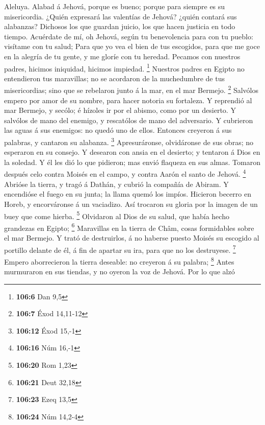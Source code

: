  Aleluya. Alabad á Jehová, porque es bueno; porque para
siempre es su misericordia.  ¿Quién expresará las valentías
de Jehová? ¿quién contará sus alabanzas?  Dichosos los que
guardan juicio, los que hacen justicia en todo tiempo. 
Acuérdate de mí, oh Jehová, según tu benevolencia para con tu pueblo:
visítame con tu salud;  Para que yo vea el bien de tus
escogidos, para que me goce en la alegría de tu gente, y me gloríe con
tu heredad.  Pecamos con nuestros padres, hicimos iniquidad,
hicimos impiedad. \footnote{\textbf{106:6} Dan 9,5} 
Nuestros padres en Egipto no entendieron tus maravillas; no se acordaron
de la muchedumbre de tus misericordias; sino que se rebelaron junto á la
mar, en el mar Bermejo. \footnote{\textbf{106:7} Éxod 14,11-12}
 Salvólos empero por amor de su nombre, para hacer notoria
su fortaleza.  Y reprendió al mar Bermejo, y secólo; é
hízoles ir por el abismo, como por un desierto.  Y salvólos
de mano del enemigo, y rescatólos de mano del adversario. 
Y cubrieron las aguas á sus enemigos: no quedó uno de ellos.
 Entonces creyeron á sus palabras, y cantaron su alabanza.
\footnote{\textbf{106:12} Éxod 15,-1}  Apresuráronse,
olvidáronse de sus obras; no esperaron en su consejo.  Y
desearon con ansia en el desierto; y tentaron á Dios en la soledad.
 Y él les dió lo que pidieron; mas envió flaqueza en sus
almas.  Tomaron después celo contra Moisés en el campo, y
contra Aarón el santo de Jehová. \footnote{\textbf{106:16} Núm 16,-1}
 Abrióse la tierra, y tragó á Dathán, y cubrió la compañía
de Abiram.  Y encendióse el fuego en su junta; la llama
quemó los impíos.  Hicieron becerro en Horeb, y
encorváronse á un vaciadizo.  Así trocaron su gloria por la
imagen de un buey que come hierba. \footnote{\textbf{106:20} Rom 1,23}
 Olvidaron al Dios de su salud, que había hecho grandezas
en Egipto; \footnote{\textbf{106:21} Deut 32,18} 
Maravillas en la tierra de Châm, cosas formidables sobre el mar Bermejo.
 Y trató de destruirlos, á no haberse puesto Moisés su
escogido al portillo delante de él, á fin de apartar su ira, para que no
los destruyese. \footnote{\textbf{106:23} Ezeq 13,5} 
Empero aborrecieron la tierra deseable: no creyeron á su palabra;
\footnote{\textbf{106:24} Núm 14,2-4}  Antes murmuraron en
sus tiendas, y no oyeron la voz de Jehová.  Por lo que alzó
